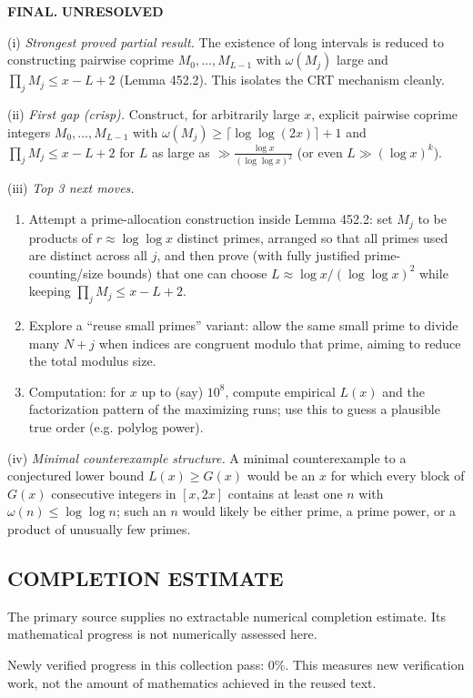 \textbf{FINAL.} \textbf{UNRESOLVED}

(i) \emph{Strongest proved partial result.} The existence of long intervals is reduced to constructing pairwise coprime $M_0,\dots,M_{L-1}$ with $\omega(M_j)$ large and $\prod_j M_j\le x-L+2$ (Lemma 452.2). This isolates the CRT mechanism cleanly.

(ii) \emph{First gap (crisp).} Construct, for arbitrarily large $x$, explicit pairwise coprime integers $M_0,\dots,M_{L-1}$ with $\omega(M_j)\ge \lceil\log\log(2x)\rceil+1$ and $\prod_j M_j\le x-L+2$ for $L$ as large as $\gg \frac{\log x}{(\log\log x)^2}$ (or even $L\gg (\log x)^k$).

(iii) \emph{Top 3 next moves.}
\begin{enumerate}
\item Attempt a prime-allocation construction inside Lemma 452.2: set $M_j$ to be products of $r\approx\log\log x$ distinct primes, arranged so that all primes used are distinct across all $j$, and then prove (with fully justified prime-counting/size bounds) that one can choose $L\approx \log x/(\log\log x)^2$ while keeping $\prod_j M_j\le x-L+2$.
\item Explore a ``reuse small primes'' variant: allow the same small prime to divide many $N+j$ when indices are congruent modulo that prime, aiming to reduce the total modulus size.
\item Computation: for $x$ up to (say) $10^8$, compute empirical $L(x)$ and the factorization pattern of the maximizing runs; use this to guess a plausible true order (e.g. polylog power).
\end{enumerate}

(iv) \emph{Minimal counterexample structure.} A minimal counterexample to a conjectured lower bound $L(x)\ge G(x)$ would be an $x$ for which every block of $G(x)$ consecutive integers in $[x,2x]$ contains at least one $n$ with $\omega(n)\le \log\log n$; such an $n$ would likely be either prime, a prime power, or a product of unusually few primes.




\subsection*{COMPLETION ESTIMATE}
The primary source supplies no extractable numerical completion estimate. Its mathematical progress is not numerically assessed here.

Newly verified progress in this collection pass: $0\%$. This measures new verification work, not the amount of mathematics achieved in the reused text.
